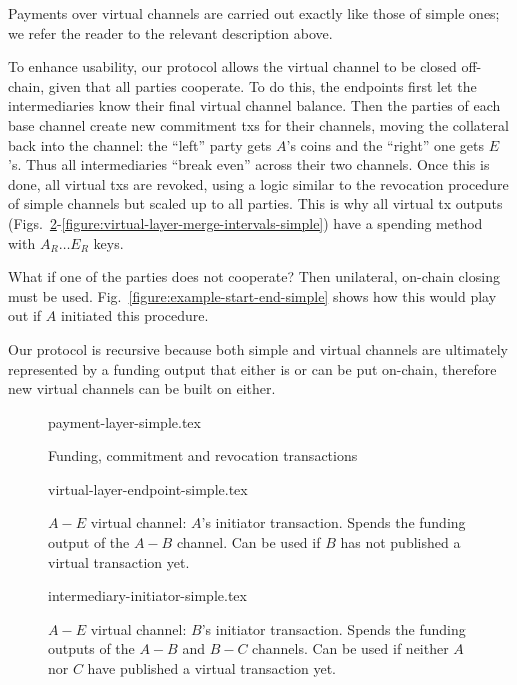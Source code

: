   Payments over virtual channels are carried out exactly like those of simple
  ones; we refer the reader to the relevant description above.

  To enhance usability, our protocol allows the virtual channel to be closed
  off-chain, given that all parties cooperate. To do this, the endpoints first
  let the intermediaries know their final virtual channel balance. Then the
  parties of each base channel create new commitment txs for their channels,
  moving the collateral back into the channel: the ``left'' party gets $A$'s
  coins and the ``right'' one gets $E$'s. Thus all intermediaries ``break even''
  across their two channels. Once this is done, all virtual txs are revoked,
  using a logic similar to the revocation procedure of simple channels but
  scaled up to all parties. This is why all virtual tx outputs
  (Figs.~\ref{figure:virtual-layer-endpoint-simple}-\ref{figure:virtual-layer-merge-intervals-simple})
  have a spending method with $A_R \dots E_R$ keys.

  What if one of the parties does not cooperate? Then unilateral, on-chain
  closing must be used. Fig.~\ref{figure:example-start-end-simple} shows how
  this would play out if $A$ initiated this procedure.

  Our protocol is recursive because both simple and virtual channels are
  ultimately represented by a funding output that either is or can be put
  on-chain, therefore new virtual channels can be built on either.

  \begin{figure}
    \centering
    {payment-layer-simple.tex}
    \caption{Funding, commitment and revocation transactions}
    \label{figure:payment-layer-simple}
  \end{figure}

  \begin{figure}
    {virtual-layer-endpoint-simple.tex}
    \caption{$A-E$ virtual channel: $A$'s initiator transaction. Spends the
    funding output of the $A-B$ channel. Can be used if $B$ has not published
    a virtual transaction yet.}
    \label{figure:virtual-layer-endpoint-simple}
  \end{figure}

  \begin{figure}
    {intermediary-initiator-simple.tex}
    \caption{$A-E$ virtual channel: $B$'s initiator transaction. Spends the
    funding outputs of the $A-B$ and $B-C$ channels. Can be used if neither
    $A$ nor $C$ have published a virtual transaction yet.}
    \label{figure:virtual-layer-initiator-simple}
  \end{figure}

